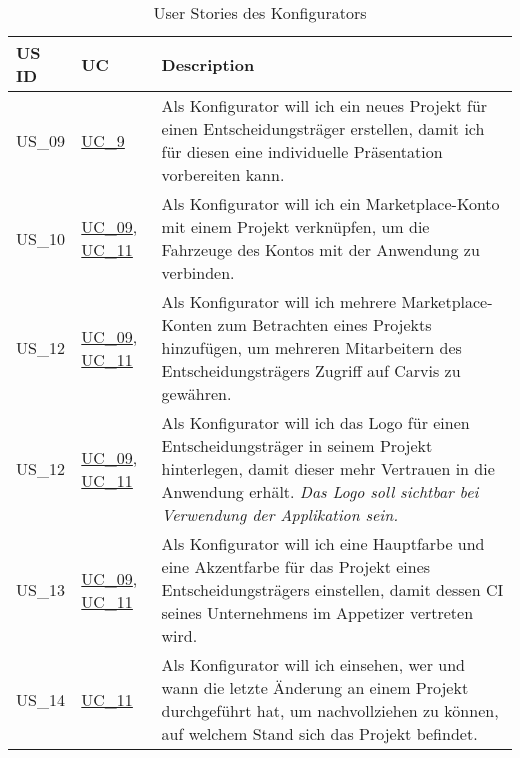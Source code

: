  \sffamily
  \begin{footnotesize}
    \begin{longtable}[L L L]{ p{} p{} p{} }
      \caption                       %
          {User Stories des Konfigurators} %
          \\
      \toprule
      \textbf{US ID} & \textbf{UC} & \textbf{Description} \\
      \midrule
      \hypertarget{Ref:US9}{US\_09} & \hyperlink{Ref:UC9}{UC\_9} & Als Konfigurator will ich ein neues Projekt für einen Entscheidungsträger erstellen, damit ich für diesen eine individuelle Präsentation vorbereiten kann. \\
      \hypertarget{Ref:US10}{US\_10} & \hyperlink{Ref:UC9}{UC\_09}, \newline \hyperlink{Ref:UC11}{UC\_11} & Als Konfigurator will ich ein Marketplace-Konto mit einem Projekt verknüpfen, um die Fahrzeuge des Kontos mit der Anwendung zu verbinden.\\
      \hypertarget{Ref:US12}{US\_12} & \hyperlink{Ref:UC9}{UC\_09}, \newline \hyperlink{Ref:UC11}{UC\_11} & Als Konfigurator will ich mehrere Marketplace-Konten zum Betrachten eines Projekts hinzufügen, um mehreren Mitarbeitern des Entscheidungsträgers Zugriff auf Carvis zu gewähren. \\
      \hypertarget{Ref:US12}{US\_12} & \hyperlink{Ref:UC9}{UC\_09}, \newline \hyperlink{Ref:UC11}{UC\_11} & Als Konfigurator will ich das Logo für einen Entscheidungsträger in seinem Projekt hinterlegen, damit dieser mehr Vertrauen in die Anwendung erhält. 
      \newline\newline
      \emph{Das Logo soll sichtbar bei Verwendung der Applikation sein.}
      \\
      \hypertarget{Ref:US13}{US\_13} & \hyperlink{Ref:UC9}{UC\_09}, \newline \hyperlink{Ref:UC11}{UC\_11} & Als Konfigurator will ich eine Hauptfarbe und eine Akzentfarbe für das Projekt eines Entscheidungsträgers einstellen, damit dessen CI seines Unternehmens im Appetizer vertreten wird. \\
      \hypertarget{Ref:US14}{US\_14} & \hyperlink{Ref:UC11}{UC\_11} & Als Konfigurator will ich einsehen, wer und wann die letzte Änderung an einem Projekt durchgeführt hat, um nachvollziehen zu können, auf welchem Stand sich das Projekt befindet. \\

\end{longtable}
\end{footnotesize}
